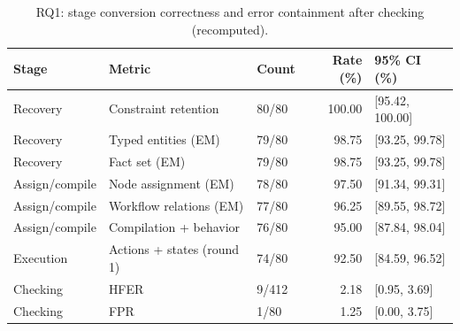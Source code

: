 \begin{table}[!htbp]
\centering
\caption{RQ1: stage conversion correctness and error containment after checking (recomputed).}
\label{tab:rq1-main}
\footnotesize\setlength{\tabcolsep}{3pt}
\begin{tabular*}{\linewidth}{@{\extracolsep{\fill}}lllrl@{}}
\toprule
Stage & Metric & Count & Rate (\%) & 95\% CI (\%) \\
\midrule
Recovery & Constraint retention & 80/80 & 100.00 & [95.42, 100.00] \\
Recovery & Typed entities (EM) & 79/80 & 98.75 & [93.25, 99.78] \\
Recovery & Fact set (EM) & 79/80 & 98.75 & [93.25, 99.78] \\
Assign/compile & Node assignment (EM) & 78/80 & 97.50 & [91.34, 99.31] \\
Assign/compile & Workflow relations (EM) & 77/80 & 96.25 & [89.55, 98.72] \\
Assign/compile & Compilation + behavior & 76/80 & 95.00 & [87.84, 98.04] \\
Execution & Actions + states (round 1) & 74/80 & 92.50 & [84.59, 96.52] \\
\midrule
Checking & HFER & 9/412 & 2.18 & [0.95, 3.69] \\
Checking & FPR & 1/80 & 1.25 & [0.00, 3.75] \\
\bottomrule
\end{tabular*}
\end{table}
